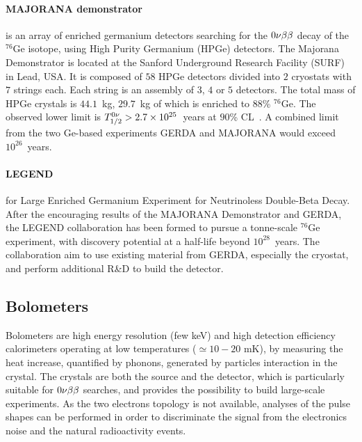 \paragraph{MAJORANA demonstrator} is an array of enriched germanium detectors searching for the $0\nu\beta\beta$ decay of the $^{76}$Ge isotope, using High Purity Germanium (HPGe) detectors.
The Majorana Demonstrator is located at the Sanford Underground Research Facility (SURF) in Lead, USA.
It is composed of $58$ HPGe detectors divided into $2$ cryostats with $7$ strings each.
Each string is an assembly of $3$, $4$ or $5$ detectors.
The total mass of HPGe crystals is $44.1$~kg, $29.7$~kg of which is enriched to $88$\% $^{76}$Ge.
The observed lower limit is $T_{1/2}^{0\nu}>2.7\times 10^{25}$~years at $90$\% CL~\cite{art:majorana2019}.
A combined limit from the two Ge-based experiments GERDA and MAJORANA would exceed $10^{26}$~years.

\paragraph{LEGEND} for Large Enriched Germanium Experiment for Neutrinoless Double-Beta Decay.
After the encouraging results of the MAJORANA Demonstrator and GERDA, the LEGEND collaboration has been formed to pursue a tonne-scale $^{76}$Ge experiment, with discovery potential at a half-life beyond $10^{28}$~years.
The collaboration aim to use existing material from GERDA, especially the cryostat, and perform additional R\&D to build the detector.

\subsection{Bolometers}
\label{subsec:bolometers}

Bolometers are high energy resolution (few keV) and high detection efficiency calorimeters operating at low temperatures ($\simeq 10-20$ mK), by measuring the heat increase, quantified by phonons, generated by particles interaction in the crystal.
The crystals are both the source and the detector, which is particularly suitable for $0\nu\beta\beta$ searches, and provides the possibility to build large-scale experiments.
As the two electrons topology is not available, analyses of the pulse shapes can be performed in order to discriminate the signal from the electronics noise and the natural radioactivity events.

